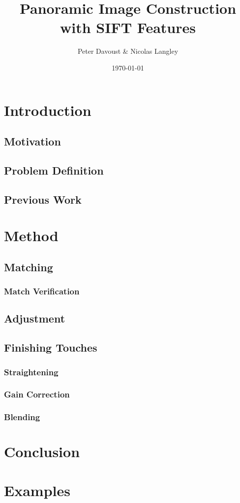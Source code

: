 \documentclass{article}
\title{Panoramic Image Construction with SIFT Features}
\author{Peter Davoust \& Nicolas Langley}
\date{\today}
\begin{document}
\maketitle
\newpage
\section{Introduction}
\subsection{Motivation}
\subsection{Problem Definition}
\subsection{Previous Work}

\section{Method}
\subsection{Matching}
\subsubsection{Match Verification}
\subsection{Adjustment}
\subsection{Finishing Touches}
\subsubsection{Straightening}
\subsubsection{Gain Correction}
\subsubsection{Blending}

\section{Conclusion}

\section{Examples}
\end{document}
